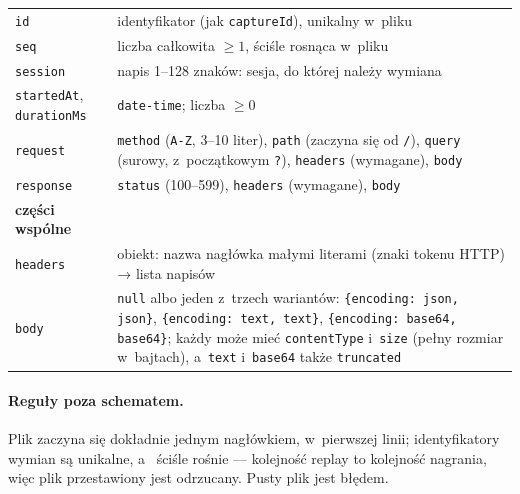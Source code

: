 {\begin{xltabular}{\linewidth}{@{}>{\raggedright\arraybackslash}p{3.6cm} >{\raggedright\arraybackslash}X@{}}
\texttt{id} & identyfikator (jak \texttt{captureId}), unikalny w~pliku \\
\texttt{seq} & liczba całkowita $\geq 1$, ściśle rosnąca w~pliku \\
\texttt{session} & napis 1--128 znaków: sesja, do której należy wymiana \\
\texttt{startedAt}, \texttt{durationMs} & \texttt{date-time}; liczba $\geq 0$ \\
\texttt{request} & \texttt{method} (\texttt{A-Z}, 3--10 liter), \texttt{path} (zaczyna się od
\texttt{/}), \texttt{query} (surowy, z~początkowym \texttt{?}), \texttt{headers} (wymagane),
\texttt{body} \\
\texttt{response} & \texttt{status} (100--599), \texttt{headers} (wymagane), \texttt{body} \\
\midrule
\textbf{części wspólne} & \\
\texttt{headers} & obiekt: nazwa nagłówka małymi literami (znaki tokenu HTTP) → lista
napisów \\
\texttt{body} & \texttt{null} albo jeden z~trzech wariantów: \texttt{\{encoding: json, json\}},
\texttt{\{encoding: text, text\}}, \texttt{\{encoding: base64, base64\}}; każdy może mieć
\texttt{contentType} i~\texttt{size} (pełny rozmiar w~bajtach), a~\texttt{text} i~\texttt{base64} także \texttt{truncated} \\
\end{xltabular}
}

\paragraph{Reguły poza schematem.} Plik zaczyna się dokładnie jednym nagłówkiem, w~pierwszej
linii; identyfikatory wymian są unikalne, a~ ściśle rośnie --- kolejność replay
to kolejność nagrania, więc plik przestawiony jest odrzucany. Pusty plik jest błędem.


